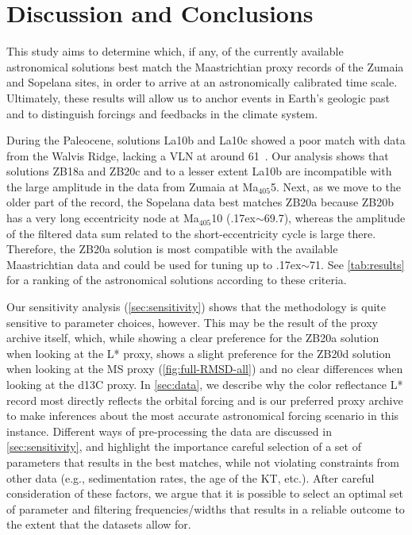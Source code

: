 \documentclass[draft]{agujournal2019}
\newcommand{\appr}{\raise.17ex\hbox{\(\scriptstyle\sim\)}} %
\newcommand{\ma}[1]{Ma\(_{405}\)#1} %
\begin{document}
\section{Discussion and Conclusions}\label{sec:discussion}

This study aims to determine which, if any, of the currently available astronomical solutions best match the Maastrichtian proxy records of the Zumaia and Sopelana sites, in order to arrive at an astronomically calibrated time scale.
Ultimately, these results will allow us to anchor events in Earth's geologic past and to distinguish forcings and feedbacks in the climate system.

During the Paleocene, solutions La10b and La10c showed a poor match with data from the Walvis Ridge, lacking a \gls{VLN} at around \qty{61}{\millionyearago}~\cite{ZeebeLourens2022EPSL}.
Our analysis shows that solutions ZB18a and ZB20c and to a lesser extent La10b are incompatible with the large amplitude in the data from Zumaia at \ma{5}.
Next, as we move to the older part of the record, the Sopelana data best matches ZB20a because ZB20b has a very long eccentricity node at \ma{10} (\appr\qty{69.7}{\millionyearago}), whereas the amplitude of the filtered data sum related to the short-eccentricity cycle is large there.
Therefore, the ZB20a solution is most compatible with the available Maastrichtian data and could be used for tuning up to \appr\qty{71}{\millionyearago}.
See \cref{tab:results} for a ranking of the astronomical solutions according to these criteria.

Our sensitivity analysis (\ref{sec:sensitivity}) shows that the methodology is quite sensitive to parameter choices, however.
This may be the result of the proxy archive itself, which, while showing a clear preference for the ZB20a solution when looking at the \gls{L*} proxy, shows a slight preference for the ZB20d solution when looking at the \gls{MS} proxy (\cref{fig:full-RMSD-all}) and no clear differences when looking at the \gls{d13C} proxy.
In \cref{sec:data}, we describe why the color reflectance \gls{L*} record most directly reflects the orbital forcing and is our preferred proxy archive to make inferences about the most accurate astronomical forcing scenario in this instance.
Different ways of pre-processing the data are discussed in \ref{sec:sensitivity}, and highlight the importance careful selection of a set of parameters that results in the best matches, while not violating constraints from other data (e.g., sedimentation rates, the age of the \gls{KT}, etc.).
After careful consideration of these factors, we argue that it is possible to select an optimal set of parameter and filtering frequencies/widths that results in a reliable outcome to the extent that the datasets allow for.
\end{document}
